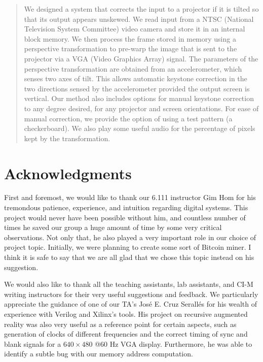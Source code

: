 \documentclass{article}
\begin{document}
\maketitle

\begin{abstract}
We designed a system that corrects the input to a projector if it is tilted so that its output appears unskewed.
We read input from a NTSC (National Television System Committee) video camera and store it in an internal block memory.
We then process the frame stored in memory using a perspective transformation to pre-warp the image that is sent to the projector via a VGA (Video Graphics Array) signal.
The parameters of the perspective transformation are obtained from an accelerometer, which senses two axes of tilt.
This allows automatic keystone correction in the two directions sensed by the accelerometer provided the output screen is vertical.
Our method also includes options for manual keystone correction to any degree desired, for any projector and screen orientations.
For ease of manual correction, we provide the option of using a test pattern (a checkerboard).
We also play some useful audio for the percentage of pixels kept by the transformation.
\end{abstract}

\newpage
\section*{Acknowledgments}
First and foremost, we would like to thank our 6.111 instructor Gim Hom for his tremondous patience, experience, and intuition regarding digital systems.
This project would never have been possible without him,
and countless number of times he saved our group a huge amount of time by some very critical observations.
Not only that, he also played a very important role in our choice of project topic.
Initially, we were planning to create some sort of Bitcoin miner.
I think it is safe to say that we are all glad that we chose this topic instead on his suggestion.

We would also like to thank all the teaching assistants, lab assistants, and CI-M writing instructors for their very useful suggestions and feedback.
We particularly appreciate the guidance of one of our TA's Jos\'{e} E. Cruz Serall\'{e}s for his wealth of experience with Verilog and Xilinx's tools.
His project on recursive augmented reality was also very useful as a reference point for certain aspects,
such as generation of clocks of different frequencies and the correct timing of sync and blank signals for a $640 \times 480$  @60 Hz VGA display.
Furthermore, he was able to identify a subtle bug with our memory address computation.
\end{document}
